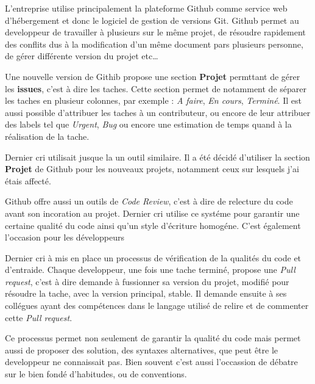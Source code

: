 \bigskip

L'entreprise utilise principalement la plateforme Github comme service
web d'hébergement et donc le logiciel de gestion de versions Git. Github
permet au developpeur de travailler à plusieurs sur le même projet, de
résoudre rapidement des conflits dus à la modification d'un même
document pars plusieurs personne, de gérer différente version du projet
etc\ldots{}

\bigskip

Une nouvelle version de Githib propose une section \textbf{Projet}
permttant de gérer les \textbf{issues}, c'est à dire les taches. Cette
section permet de notamment de séparer les taches en plusieur colonnes,
par exemple : \emph{A faire}, \emph{En cours}, \emph{Terminé}. Il est
aussi possible d'attribuer les taches à un contributeur, ou encore de
leur attribuer des labels tel que \emph{Urgent}, \emph{Bug} ou encore
une estimation de temps quand à la réalisation de la tache.

\bigskip

Dernier cri utilisait jusque la un outil similaire. Il a été décidé
d'utiliser la section \textbf{Projet} de Github pour les nouveaux
projets, notamment ceux sur lesquels j'ai étais affecté.

\bigskip

Github offre aussi un outils de \emph{Code Review}, c'est à dire de
relecture du code avant son incoration au projet. Dernier cri utilise ce
systéme pour garantir une certaine qualité du code ainsi qu'un style
d'écriture homogéne. C'est également l'occasion pour les développeurs

\bigskip

Dernier cri à mis en place un processus de vérification de la qualités
du code et d'entraide. Chaque developpeur, une fois une tache terminé,
propose une \emph{Pull request}, c'est à dire demande à fussionner sa
version du projet, modifié pour résoudre la tache, avec la version
principal, stable. Il demande ensuite à ses collégues ayant des
compétences dans le langage utilisé de relire et de commenter cette
\emph{Pull request}.

\bigskip

Ce processus permet non seulement de garantir la qualité du code mais
permet aussi de proposer des solution, des syntaxes alternatives, que
peut être le developpeur ne connaissait pas. Bien souvent c'est aussi
l'occassion de débatre sur le bien fondé d'habitudes, ou de conventions.

\bigskip

